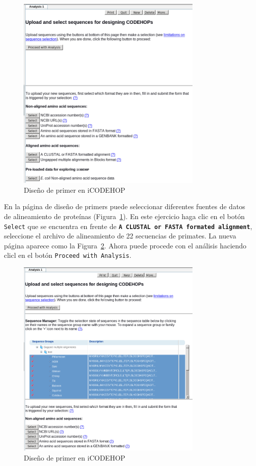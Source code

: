 \documentclass[letter,11pt]{book}
\begin{document}
\begin{figure}[hb!]
\centering
 \includegraphics[width=9cm]{Figs/CODEHOP_design.png}
 \caption{\label{fig:CODEHOP_design}Diseño de primer en iCODEHOP}
\end{figure}

En la página de diseño de primers puede seleccionar diferentes fuentes de datos de alineamiento de proteínas (Figura~\ref{fig:CODEHOP_design}). En este ejercicio haga clic en el botón \Verb+Select+ que se encuentra en frente de \textbf{\Verb+A CLUSTAL or FASTA formated alignment+}, seleccione el archivo de alineamiento de 22 secuencias de primates. La nueva página aparece como la Figura~\ref{fig:CODEHOP_design2}. Ahora puede procede con el análisis haciendo clicl en el botón \Verb+Proceed with Analysis+.

\begin{figure}[h!]
\centering
 \includegraphics[width=9cm]{Figs/CODEHOP_design2.png}
 \caption{\label{fig:CODEHOP_design2}Diseño de primer en iCODEHOP}
\end{figure}
\end{document}
